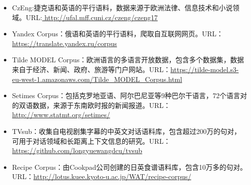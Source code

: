 \begin{appendices}
\begin{itemize}
\vspace{0.5em}
\item CzEng:捷克语和英语的平行语料，数据来源于欧洲法律、信息技术和小说领域。URL:\url{ http://ufal.mff.cuni.cz/czeng/czeng17}
\vspace{0.5em}
\item Yandex Corpus：俄语和英语的平行语料，爬取自互联网网页。URL：\url{https://translate.yandex.ru/corpus}
\vspace{0.5em}
\item Tilde MODEL Corpus：欧洲语言的多语言开放数据，包含多个数据集，数据来自于经济、新闻、政府、旅游等门户网站。URL：\url{https://tilde-model.s3-eu-west-1.amazonaws.com/Tilde_MODEL_Corpus.html}
\vspace{0.5em}
\item Setimes Corpus：包括克罗地亚语、阿尔巴尼亚等9种巴尔干语言，72个语言对的双语数据，来源于东南欧时报的新闻报道。URL：\url{http://www.statmt.org/setimes/}
\vspace{0.5em}
\item TVsub：收集自电视剧集字幕的中英文对话语料库，包含超过200万的句对，可用于对话领域和长距离上下文信息的研究。URL：\url{https://github.com/longyuewangdcu/tvsub}
\vspace{0.5em}
\item Recipe Corpus：由Cookpad公司创建的日英食谱语料库，包含10万多的句对。URL：\url{http://lotus.kuee.kyoto-u.ac.jp/WAT/recipe-corpus/}
\end{itemize}


\end{appendices}


